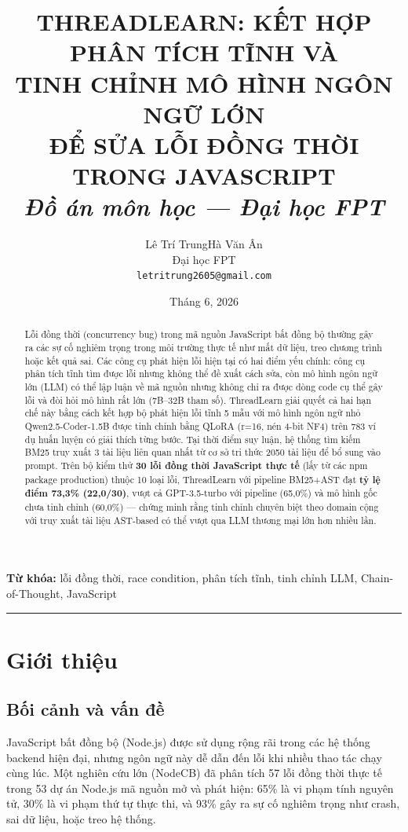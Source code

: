 \documentclass[12pt]{article}
\title{%
  \large\textbf{THREADLEARN: KẾT HỢP PHÂN TÍCH TĨNH VÀ}\\[2pt]
  \large\textbf{TINH CHỈNH MÔ HÌNH NGÔN NGỮ LỚN}\\[2pt]
  \large\textbf{ĐỂ SỬA LỖI ĐỒNG THỜI TRONG JAVASCRIPT}\\[8pt]
  \normalsize\textit{Đồ án môn học --- Đại học FPT}
}
\author{%
  Lê Trí Trung\quad Hà Văn Ân\\[2pt]
  \small Đại học FPT\\
  \small\texttt{letritrung2605@gmail.com}
}
\date{Tháng 6, 2026}
\begin{document}
\maketitle
\thispagestyle{fancy}

\begin{abstract}
\noindent
Lỗi đồng thời (concurrency bug) trong mã nguồn JavaScript bất đồng bộ thường gây
ra các sự cố nghiêm trọng trong môi trường thực tế như mất dữ liệu, treo chương
trình hoặc kết quả sai.
Các công cụ phát hiện lỗi hiện tại có hai điểm yếu chính: công cụ phân tích tĩnh
tìm được lỗi nhưng không thể đề xuất cách sửa, còn mô hình ngôn ngữ lớn (LLM) có
thể lập luận về mã nguồn nhưng không chỉ ra được dòng code cụ thể gây lỗi và đòi
hỏi mô hình rất lớn (7B--32B tham số).
ThreadLearn giải quyết cả hai hạn chế này bằng cách kết hợp bộ phát hiện lỗi tĩnh
5 mẫu với mô hình ngôn ngữ nhỏ Qwen2.5-Coder-1.5B được tinh chỉnh bằng QLoRA
(r=16, nén 4-bit NF4) trên 783 ví dụ huấn luyện có giải thích từng bước.
Tại thời điểm suy luận, hệ thống tìm kiếm BM25 truy xuất 3 tài liệu liên quan nhất
từ cơ sở tri thức 2050 tài liệu để bổ sung vào prompt.
Trên bộ kiểm thử \textbf{30 lỗi đồng thời JavaScript thực tế} (lấy từ các npm package
production) thuộc 10 loại lỗi,
ThreadLearn với pipeline BM25+AST đạt \textbf{tỷ lệ điểm 73,3\% (22,0/30)},
vượt cả GPT-3.5-turbo với pipeline (65,0\%) và mô hình gốc chưa tinh chỉnh (60,0\%)
--- chứng minh rằng tinh chỉnh chuyên biệt theo domain cộng với truy xuất tài liệu
AST-based có thể vượt qua LLM thương mại lớn hơn nhiều lần.
\end{abstract}

\noindent\textbf{Từ khóa:} lỗi đồng thời, race condition, phân tích tĩnh,
tinh chỉnh LLM, Chain-of-Thought, JavaScript

\bigskip\hrule\bigskip

\section{Giới thiệu}
\label{sec:gioithieu}

\subsection{Bối cảnh và vấn đề}

JavaScript bất đồng bộ (Node.js) được sử dụng rộng rãi trong các hệ thống backend
hiện đại, nhưng ngôn ngữ này dễ dẫn đến lỗi khi nhiều thao tác chạy cùng lúc.
Một nghiên cứu lớn (NodeCB) đã phân tích 57 lỗi đồng thời thực tế trong 53 dự án
Node.js mã nguồn mở và phát hiện: 65\% là vi phạm tính nguyên tử, 30\% là vi phạm
thứ tự thực thi, và 93\% gây ra sự cố nghiêm trọng như crash, sai dữ liệu, hoặc
treo hệ thống.
\end{document}
